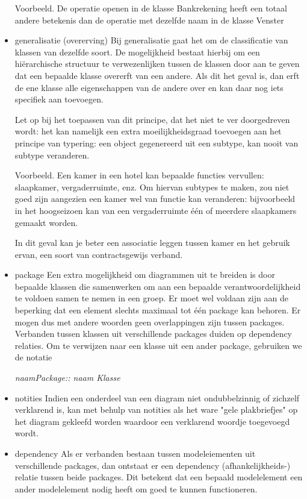 \begin{itemize}
Voorbeeld. De operatie openen in de klasse Bankrekening heeft een totaal andere betekenis dan de operatie met dezelfde naam in de klasse Venster
    \item generalisatie (overerving)
Bij generalisatie gaat het om de classificatie van klassen van dezelfde soort. De mogelijkheid bestaat hierbij om een hiërarchische structuur te verwezenlijken tussen de klassen door aan te geven dat een bepaalde klasse overerft van een andere. Als dit het geval is, dan erft de ene klasse alle eigenschappen van de andere over en kan daar nog iets specifiek aan toevoegen.

Let op bij het toepassen van dit principe, dat het niet te ver doorgedreven wordt: het kan namelijk een extra moeilijkheidsgraad toevoegen aan het principe van typering: een object gegenereerd uit een subtype, kan nooit van subtype veranderen.

Voorbeeld. Een kamer in een hotel kan bepaalde functies vervullen: slaapkamer, vergaderruimte, enz. Om hiervan subtypes te maken, zou niet goed zijn aangezien een kamer wel van functie kan veranderen: bijvoorbeeld in het hoogseizoen kan van een vergaderruimte één of meerdere slaapkamers gemaakt worden.

In dit geval kan je beter een associatie leggen tussen kamer en het gebruik ervan, een soort van contractsgewijs verband.
    \item package
Een extra mogelijkheid om diagrammen uit te breiden is door bepaalde klassen die samenwerken om aan een bepaalde verantwoordelijkheid te voldoen samen te nemen in een groep. Er moet wel voldaan zijn aan de beperking dat een element slechts maximaal tot één package kan behoren. Er mogen dus met andere woorden geen overlappingen zijn tussen packages.
Verbanden tussen klassen uit verschillende packages duiden op dependency relaties. Om te verwijzen naar een klasse uit een ander package, gebruiken we de notatie

\begin{center} \textit{naamPackage:: naam Klasse} \end{center}
      \item notities
Indien een onderdeel van een diagram niet ondubbelzinnig of zichzelf verklarend is, kan met behulp van notities als het ware "gele plakbriefjes" op het diagram gekleefd worden waardoor een verklarend woordje toegevoegd wordt.
      \item dependency
Als er verbanden bestaan tussen modeleiementen uit verschillende packages, dan ontstaat er een dependency (afhankelijkheids-) relatie tussen beide packages. Dit betekent dat een bepaald modelelement een ander modelelement nodig heeft om goed te kunnen functioneren.


\end{itemize}
